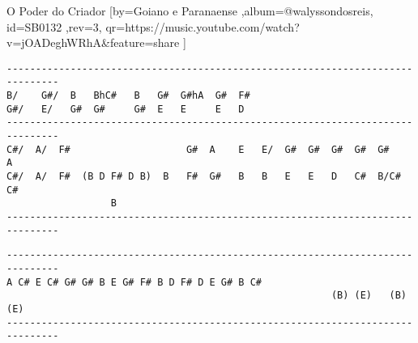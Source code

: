 \beginsong
{O Poder do Criador %
}[by={Goiano e Paranaense %
},album={@walyssondosreis},
id={SB0132 %
},rev={3}, %
qr={https://music.youtube.com/watch?v=jOADeghWRhA&feature=share %
}]
\lstset{basicstyle=\scriptsize\bf} %
\begin{lstlisting}
-------------------------------------------------------------------------------
B/    G#/  B   BhC#   B   G#  G#hA  G#  F#
G#/   E/   G#  G#     G#  E   E     E   D
-------------------------------------------------------------------------------
C#/  A/  F#                    G#  A    E   E/  G#  G#  G#  G#  G#     A
C#/  A/  F#  (B D F# D B)  B   F#  G#   B   B   E   E   D   C#  B/C#   C#
                  B                                   
-------------------------------------------------------------------------------
\end{lstlisting}
\begin{lstlisting}
-------------------------------------------------------------------------------
A C# E C# G# G# B E G# F# B D F# D E G# B C# 
                                                        (B) (E)   (B) (E)
-------------------------------------------------------------------------------
\end{lstlisting}
\beginverse 
